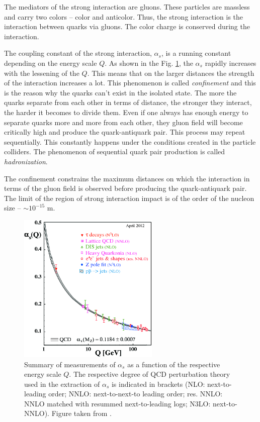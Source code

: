 The mediators of the strong interaction are gluons. These particles are massless and carry two colors -- color and anticolor. Thus, the strong 
interaction is the interaction between quarks via gluons. The color charge is conserved during the interaction.

The coupling constant of the strong interaction, $\alpha_{s}$, is a running constant depending on the energy scale $Q$. As shown in the
Fig. \ref{fig:Alpha_s}, the $\alpha_{s}$ rapidly increases with the lessening of the $Q$. This means that on the larger distances 
the strength of the interaction increases a lot. This phenomenon is called \textit{confinement} and this is the reason why the quarks
can't exist in the isolated state. The more the quarks separate from each other in terms of distance, the stronger they interact, the harder
it becomes to divide them. Even if one always has enough energy to separate quarks more and more from each other, they gluon field will become critically
high and produce the quark-antiquark pair. This process may repeat sequentially. This constantly happens under the conditions created in the
particle colliders. The phenomenon of sequential quark pair production is called \textit{hadronization}.

The confinement constrains the maximum distances on which the interaction in terms of the gluon field is observed before producing the quark-antiquark pair.
The limit of the region of strong interaction impact is of the order of the nucleon size -- $\sim 10^{-15}$ m.

\begin{figure}[t]
  \centering
  \includegraphics[width=0.6\textwidth]{01_Theory_SM/plots/Alpha_s.png}
  \caption{Summary of measurements of $\alpha_s$ as a function of the respective energy scale $Q$. The respective degree of QCD perturbation 
  theory used in the extraction of $\alpha_{s}$ is indicated in brackets (NLO: next-to-leading order; NNLO: next-to-next-to leading order; 
  res. NNLO: NNLO matched with resummed next-to-leading logs; N3LO: next-to-NNLO). Figure taken from \cite{PDG-2012}.}
  \label{fig:Alpha_s}
\end{figure}


